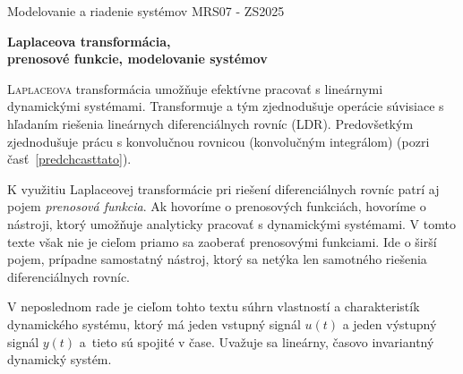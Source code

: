 \documentclass[a4paper, 10pt, ]{article}
\def\oznacenieCasti{MRS07 - ZS2025}
\begin{document}
\lstset{%
style=mystyle,
rangebeginprefix=\#\#\#\ cellB\ ,%
rangebeginsuffix=\ \#\#\#,%
rangeendprefix=\#\#\#\ cellE\ ,%
rangeendsuffix=\ \#\#\#,%
includerangemarker=false,
}





\fontsize{12pt}{22pt}\selectfont

\centerline{\textsf{Modelovanie a riadenie systémov} \hfill \textsf{\oznacenieCasti}}

\fontsize{18pt}{22pt}\selectfont





\begin{flushleft}
	\textbf{\textsf{Laplaceova transformácia,\\ prenosové funkcie, modelovanie systémov}}
\end{flushleft}





\normalsize


{\hypersetup{hidelinks}

\tableofcontents

}

\bigskip

\vspace{18pt}



\noindent
\lettrine[lines=3, nindent=0pt]{L}{aplaceova} transformácia umožňuje efektívne pracovať s lineárnymi dynamickými systémami. Transformuje a tým zjednodušuje operácie súvisiace s hľadaním riešenia lineárnych diferenciálnych rovníc (LDR). Predovšetkým zjednodušuje prácu s konvolučnou rovnicou (konvolučným integrálom) (pozri časť~\ref{predchcasttato}).

K využitiu Laplaceovej transformácie pri riešení diferenciálnych rovníc patrí aj pojem \emph{prenosová funkcia}. Ak hovoríme o prenosových funkciách, hovoríme o nástroji, ktorý umožňuje analyticky pracovať s dynamickými systémami. V tomto texte však nie je cieľom priamo sa zaoberať prenosovými funkciami. Ide o širší pojem, prípadne samostatný nástroj, ktorý sa netýka len samotného riešenia diferenciálnych rovníc.

V neposlednom rade je cieľom tohto textu súhrn vlastností a charakteristík dynamického systému, ktorý má jeden vstupný signál $u(t)$ a jeden výstupný signál $y(t)$ a~tieto sú spojité v čase. Uvažuje sa lineárny, časovo invariantný dynamický systém.
\end{document}
